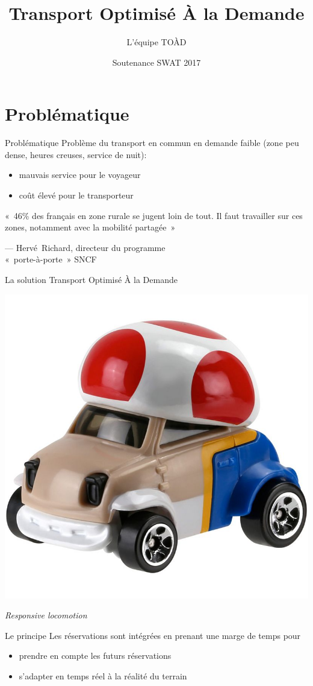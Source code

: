 \documentclass[table]{beamer}
\title{Transport Optimisé À la Demande}
\author{L'équipe TOÀD}
\institute[Kisio Digital] %
{
  Kisio Digital\\
  20 rue Hector Malot\\
  75012 Paris, France}
\date{Soutenance SWAT 2017}
\begin{document}
\begin{frame}
  \titlepage
\end{frame}

\section{Problématique}

\begin{frame}{Problématique}
  Problème du transport en commun en demande faible (zone peu dense,
  heures creuses, service de nuit):
  \begin{itemize}
  \item mauvais service pour le voyageur
  \item coût élevé pour le transporteur
  \end{itemize}

  \vfill

  \begin{em}
    «~46\% des français en zone rurale se jugent loin de tout. Il faut
    travailler sur ces zones, notamment avec la mobilité partagée~»
  \end{em}

  \raggedleft --- Hervé~Richard, directeur du programme\\
  «~porte-à-porte~» SNCF
\end{frame}

\begin{frame}{La solution}
  Transport Optimisé À la Demande

  \begin{center}
    \includegraphics[width=0.4\linewidth]{images/toad}

    \emph{Responsive locomotion}
  \end{center}
\end{frame}

\begin{frame}{Le principe}
  Les réservations sont intégrées en prenant une marge de temps pour
  \begin{itemize}
  \item prendre en compte les futurs réservations
  \item s'adapter en temps réel à la réalité du terrain
  \end{itemize}
\end{frame}
\end{document}

